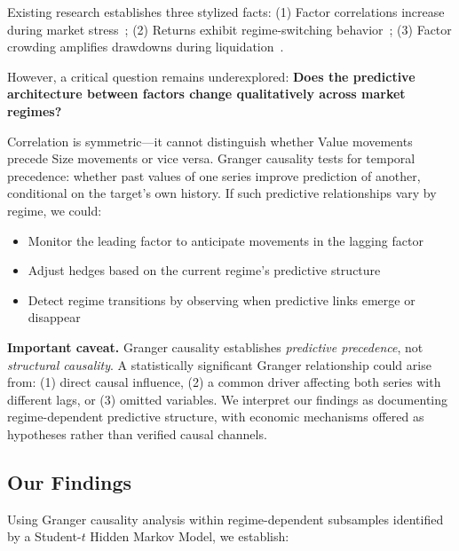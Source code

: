 \documentclass{uai2026}
\begin{document}
Existing research establishes three stylized facts:
(1) Factor correlations increase during market stress~\cite{ang2002asymmetric};
(2) Returns exhibit regime-switching behavior~\cite{hamilton1989new};
(3) Factor crowding amplifies drawdowns during liquidation~\cite{stein2009presidential}.

However, a critical question remains underexplored: \textbf{Does the predictive
architecture between factors change qualitatively across market regimes?}

Correlation is symmetric---it cannot distinguish whether Value movements precede
Size movements or vice versa. Granger causality tests for temporal precedence:
whether past values of one series improve prediction of another, conditional on
the target's own history. If such predictive relationships vary by regime, we could:
\begin{itemize}
    \item Monitor the leading factor to anticipate movements in the lagging factor
    \item Adjust hedges based on the current regime's predictive structure
    \item Detect regime transitions by observing when predictive links emerge or disappear
\end{itemize}

\textbf{Important caveat.} Granger causality establishes \emph{predictive precedence},
not \emph{structural causality}. A statistically significant Granger relationship
could arise from: (1) direct causal influence, (2) a common driver affecting both
series with different lags, or (3) omitted variables. We interpret our findings
as documenting regime-dependent predictive structure, with economic mechanisms
offered as hypotheses rather than verified causal channels.

\subsection{Our Findings}

Using Granger causality analysis within regime-dependent subsamples identified by
a Student-$t$ Hidden Markov Model, we establish:
\end{document}
